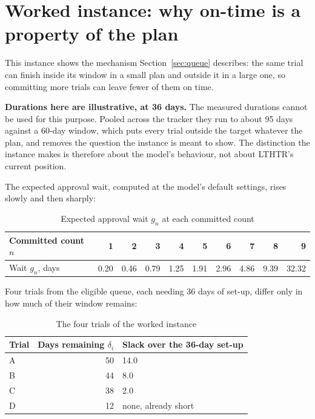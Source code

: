 \section{Worked instance: why on-time is a property of the plan}
\label{sec:worked}

This instance shows the mechanism Section~\ref{sec:queue} describes: the same trial can finish inside its window in a small plan and outside it in a large one, so committing more trials can leave fewer of them on time.

\textbf{Durations here are illustrative, at 36 days.} The measured durations cannot be used for this purpose. Pooled across the tracker they run to about 95 days against a 60-day window, which puts every trial outside the target whatever the plan, and removes the question the instance is meant to show. The distinction the instance makes is therefore about the model's behaviour, not about LTHTR's current position.

The expected approval wait, computed at the model's default settings, rises slowly and then sharply:

\begin{table}[htbp]
  \centering
  \caption{Expected approval wait $g_n$ at each committed count}
  \label{tab:waits}
  \begin{tabular}{@{}lrrrrrrrrr@{}}
    \toprule
    Committed count $n$ & 1 & 2 & 3 & 4 & 5 & 6 & 7 & 8 & 9 \\
    \midrule
    Wait $g_n$, days & 0.20 & 0.46 & 0.79 & 1.25 & 1.91 & 2.96 & 4.86 & 9.39 & 32.32 \\
    \bottomrule
  \end{tabular}
\end{table}

Four trials from the eligible queue, each needing 36 days of set-up, differ only in how much of their window remains:

\begin{table}[htbp]
  \centering
  \caption{The four trials of the worked instance}
  \label{tab:fourtrials}
  \begin{tabular}{@{}lrl@{}}
    \toprule
    Trial & Days remaining $\delta_i$ & Slack over the 36-day set-up \\
    \midrule
    A & 50 & 14.0 \\
    B & 44 & 8.0 \\
    C & 38 & 2.0 \\
    D & 12 & none, already short \\
    \bottomrule
  \end{tabular}
\end{table}

